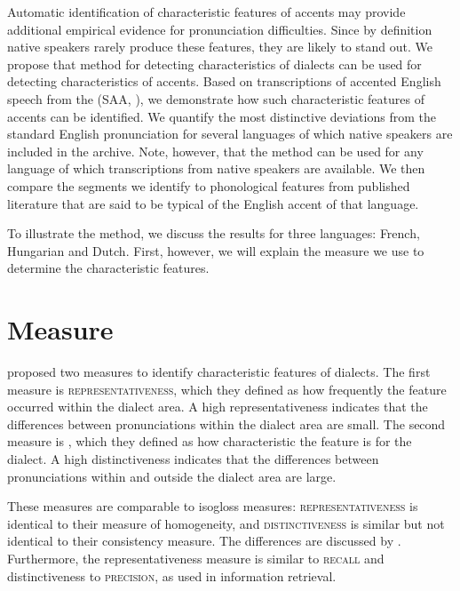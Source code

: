 \documentclass[output=paper]{LSP/langsci}
\begin{document}
Automatic identification of characteristic features of accents may provide additional empirical evidence for pronunciation difficulties. Since by definition native speakers rarely produce these features, they are likely to stand out. We propose that  method for detecting characteristics of dialects can be used for detecting characteristics of accents. Based on transcriptions of accented English speech from the  (SAA, \citealt{weinberger_speech_2011}), we demonstrate how such characteristic features of accents can be identified. We quantify the most distinctive deviations from the standard English pronunciation for several languages of which native speakers are included in the archive. Note, however, that the method can be used for any language of which transcriptions from native speakers are available. We then compare the segments we identify to phonological features from published literature that are said to be typical of the English accent of that language.

To illustrate the method, we discuss the results for three languages: French, Hungarian and Dutch. First, however, we will explain the measure we use to determine the characteristic features.

\section{Measure}
\label{s:measure}
\citet{wieling_bipartite_2011} proposed two measures to identify characteristic features of dialects. The first measure is \textsc{representativeness}, which they defined as how frequently the feature occurred within the dialect area. A high representativeness  indicates that the differences between pronunciations within the dialect area are small. The second measure is \textsc{}, which they defined as how characteristic the feature is for the dialect. A high distinctiveness indicates that the differences between pronunciations within and outside the dialect area are large. 

\largerpage
These measures are comparable to  isogloss measures: \textsc{representativeness} is identical to their measure of homogeneity, and \textsc{distinctiveness} is similar but not identical to their consistency measure. The differences are discussed by \citet{wieling_analyzing_2014}. Furthermore, the representativeness measure is similar to \textsc{recall} and distinctiveness to \textsc{precision}, as used in information retrieval.
\end{document}
